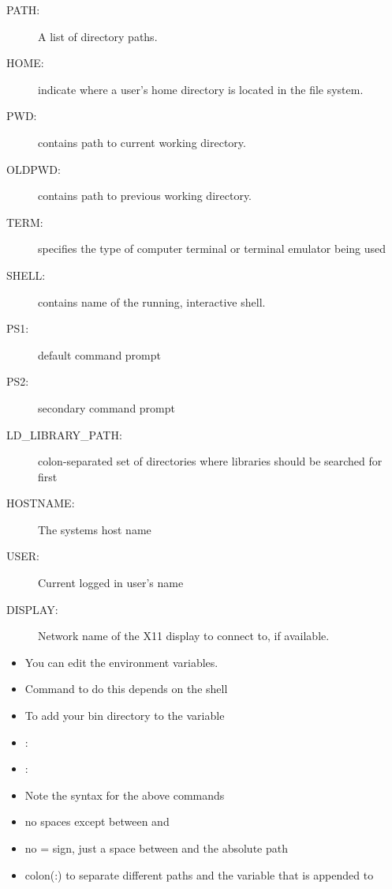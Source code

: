 \documentclass[10pt,t]{beamer}
\begin{document}
\begin{frame}
\begin{itemize}
  \end{itemize}
  \framebreak
  \begin{description}
    \item[PATH:] A list of directory paths.
    \item[HOME:] indicate where a user's home directory is located in the file system.
    \item[PWD:] contains path to current working directory.
    \item[OLDPWD:] contains path to previous working directory.
    \item[TERM:] specifies the type of computer terminal or terminal emulator being used
    \item[SHELL:] contains name of the running, interactive shell.
    \item[PS1:] default command prompt
    \item[PS2:] secondary command prompt
    \item[LD\_LIBRARY\_PATH:] colon-separated set of directories where libraries should be searched for first
    \item[HOSTNAME:] The systems host name
    \item[USER:] Current logged in user's name
    \item[DISPLAY:] Network name of the X11 display to connect to, if available.
  \end{description}
  \framebreak
  \begin{itemize}
    \item You can edit the environment variables.
    \item Command to do this depends on the shell
    \item[$\mybigstar$] To add your bin directory to the  variable
    \item[] : 
    \item[] : 
    \item[$\mybigstar$] Note the syntax for the above commands
    \item[$\mybigstar$]  {no spaces except between  and }
    \item[$\mybigstar$]  {no = sign, just a space between  and the absolute path}
    \item[$\mybigstar$]  {colon(:) to separate different paths and the variable that is appended to}

\end{itemize}
\end{frame}
\end{document}
